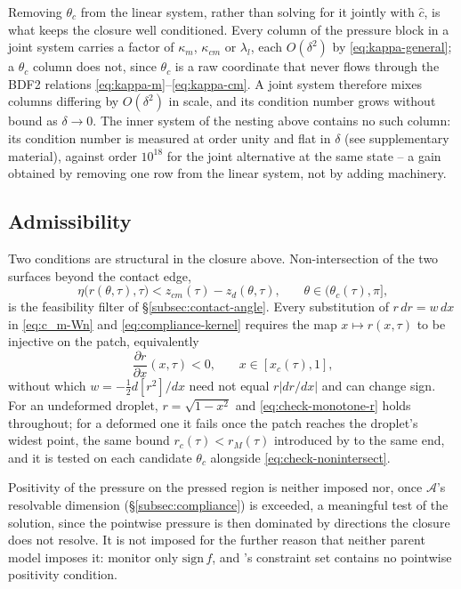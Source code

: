 Removing $\theta_c$ from the linear system, rather than solving for it jointly with $\hat c$, is what keeps the closure well conditioned. Every column of the pressure block in a joint system carries a factor of $\kappa_m$, $\kappa_{cm}$ or $\lambda_l$, each $O(\delta^2)$ by \eqref{eq:kappa-general}; a $\theta_c$ column does not, since $\theta_c$ is a raw coordinate that never flows through the BDF2 relations \eqref{eq:kappa-m}--\eqref{eq:kappa-cm}. A joint system therefore mixes columns differing by $O(\delta^2)$ in scale, and its condition number grows without bound as $\delta\to0$. The inner system of the nesting above contains no such column: its condition number is measured at order unity and flat in $\delta$ (see supplementary material), against order $10^{18}$ for the joint alternative at the same state -- a gain obtained by removing one row from the linear system, not by adding machinery.

\subsection{Admissibility}
\label{subsec:admissibility}

Two conditions are structural in the closure above. Non-intersection of the two surfaces beyond the contact edge,
\begin{equation}
    \eta\big(r(\theta,\tau),\tau\big) < z_{cm}(\tau)-z_d(\theta,\tau)\text{,}\qquad \theta\in(\theta_c(\tau),\pi]\text{,}
    \label{eq:check-nonintersect}
\end{equation}
is the feasibility filter of \S\ref{subsec:contact-angle}. Every substitution of $r\,dr=w\,dx$ in \eqref{eq:c_m-Wn} and \eqref{eq:compliance-kernel} requires the map $x\mapsto r(x,\tau)$ to be injective on the patch, equivalently
\begin{equation}
    \frac{\partial r}{\partial x}(x,\tau) < 0\text{,}\qquad x\in[x_c(\tau),1]\text{,}
    \label{eq:check-monotone-r}
\end{equation}
without which $w=-\tfrac12d[r^2]/dx$ need not equal $r|dr/dx|$ and can change sign. For an undeformed droplet, $r=\sqrt{1-x^2}$ and \eqref{eq:check-monotone-r} holds throughout; for a deformed one it fails once the patch reaches the droplet's widest point, the same bound $r_c(\tau)<r_M(\tau)$ introduced by \cite{AgueroEtAl2026} to the same end, and it is tested on each candidate $\theta_c$ alongside \eqref{eq:check-nonintersect}.

Positivity of the pressure on the pressed region is neither imposed nor, once $\mathcal A$'s resolvable dimension (\S\ref{subsec:compliance}) is exceeded, a meaningful test of the solution, since the pointwise pressure is then dominated by directions the closure does not resolve. It is not imposed for the further reason that neither parent model imposes it: \cite{AlventosaEtAl2023} monitor only $\mathrm{sign}\,f$, and \cite{AgueroEtAl2026}'s constraint set contains no pointwise positivity condition.

